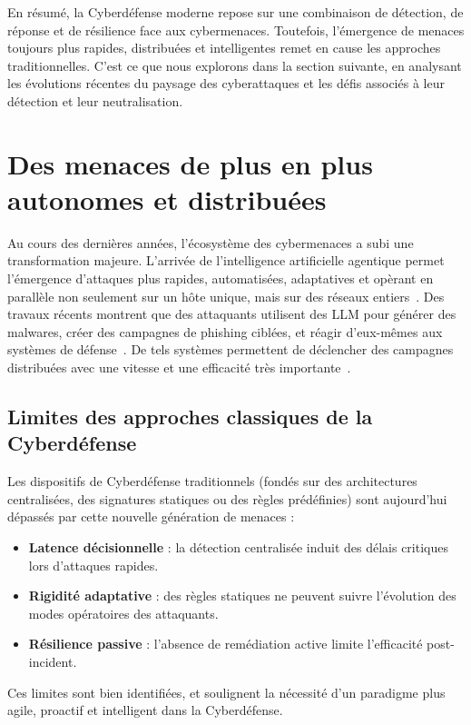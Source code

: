 \noindent
En résumé, la Cyberdéfense moderne repose sur une combinaison de détection, de réponse et de résilience face aux cybermenaces. Toutefois, l'émergence de menaces toujours plus rapides, distribuées et intelligentes remet en cause les approches traditionnelles. C'est ce que nous explorons dans la section suivante, en analysant les évolutions récentes du paysage des cyberattaques et les défis associés à leur détection et leur neutralisation.


\section{Des menaces de plus en plus autonomes et distribuées}\label{sec:evolution-menaces}

Au cours des dernières années, l'écosystème des cybermenaces a subi une transformation majeure. L'arrivée de l'intelligence artificielle agentique permet l'émergence d'attaques plus rapides, automatisées, adaptatives et opèrant en parallèle non seulement sur un hôte unique, mais sur des réseaux entiers~\cite{Cohen2020}. Des travaux récents montrent que des attaquants utilisent des \ac{LLM} pour générer des malwares, créer des campagnes de phishing ciblées, et réagir d'eux-mêmes aux systèmes de défense~\cite{AutoAttacker2024}. De tels systèmes permettent de déclencher des campagnes distribuées avec une vitesse et une efficacité très importante~\cite{AgenticAIThreats2025}.

\subsection*{Limites des approches classiques de la Cyberdéfense}

Les dispositifs de Cyberdéfense traditionnels (fondés sur des architectures centralisées, des signatures statiques ou des règles prédéfinies) sont aujourd'hui dépassés par cette nouvelle génération de menaces :
\begin{itemize}
    \item \textbf{Latence décisionnelle} : la détection centralisée induit des délais critiques lors d'attaques rapides.
    \item \textbf{Rigidité adaptative} : des règles statiques ne peuvent suivre l'évolution des modes opératoires des attaquants.
    \item \textbf{Résilience passive} : l'absence de remédiation active limite l'efficacité post-incident.
\end{itemize}
Ces limites sont bien identifiées, et soulignent la nécessité d'un paradigme plus agile, proactif et intelligent dans la Cyberdéfense.

